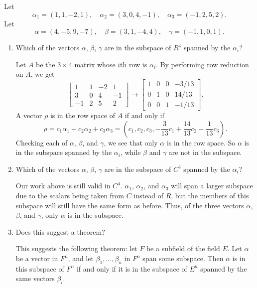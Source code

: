  Let
\begin{equation*}
  \alpha_1 = (1, 1, -2, 1), \quad
  \alpha_2 = (3, 0, 4, -1), \quad
  \alpha_3 = (-1, 2, 5, 2).
\end{equation*}
Let
\begin{equation*}
  \alpha = (4, -5, 9, -7), \quad
  \beta = (3, 1, -4, 4), \quad
  \gamma = (-1, 1, 0, 1).
\end{equation*}
\begin{enumerate}
\item Which of the vectors $\alpha$, $\beta$, $\gamma$ are in the
  subspace of $R^4$ spanned by the $\alpha_i$?
  \begin{solution}
    Let $A$ be the $3\times4$ matrix whose $i$th row is $\alpha_i$. By
    performing row reduction on $A$, we get
    \begin{equation*}
      \begin{bmatrix}
        1 & 1 & -2 & 1 \\
        3 & 0 & 4 & -1 \\
        -1 & 2 & 5 & 2
      \end{bmatrix}
      \rightarrow
      \begin{bmatrix}
        1 & 0 & 0 & -3/13 \\
        0 & 1 & 0 & 14/13 \\
        0 & 0 & 1 & -1/13
      \end{bmatrix}.
    \end{equation*}
    A vector $\rho$ is in the row space of $A$ if and only if
    \begin{equation*}
      \rho = c_1\alpha_1 + c_2\alpha_2 + c_3\alpha_3
      = \left(c_1, c_2, c_3, -\frac{3}{13}c_1
        + \frac{14}{13}c_2 - \frac1{13}c_3\right).
    \end{equation*}
    Checking each of $\alpha$, $\beta$, and $\gamma$, we see that only
    $\alpha$ is in the row space. So $\alpha$ is in the subspace
    spanned by the $\alpha_i$, while $\beta$ and $\gamma$ are not in
    the subspace.
  \end{solution}
\item Which of the vectors $\alpha$, $\beta$, $\gamma$ are in the
  subspace of $C^4$ spanned by the $\alpha_i$?
  \begin{solution}
    Our work above is still valid in $C^4$. $\alpha_1$, $\alpha_2$,
    and $\alpha_3$ will span a larger subspace due to the scalars
    being taken from $C$ instead of $R$, but the members of this
    subspace will still have the same form as before. Thus, of the
    three vectors $\alpha$, $\beta$, and $\gamma$, only $\alpha$ is in
    the subspace.
  \end{solution}
\item Does this suggest a theorem?
  \begin{solution}
    This suggests the following theorem: let $F$ be a subfield of the
    field $E$. Let $\alpha$ be a vector in $F^n$, and let
    $\beta_1,\dots,\beta_n$ in $F^n$ span some subspace. Then $\alpha$
    is in this subspace of $F^n$ if and only if it is in the subspace
    of $E^n$ spanned by the same vectors $\beta_i$.
  \end{solution}
\end{enumerate}
